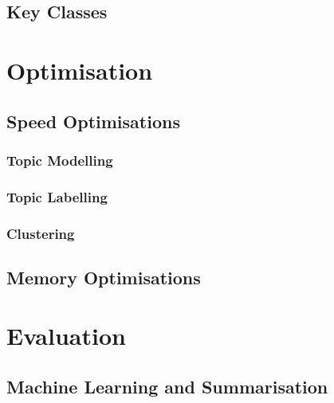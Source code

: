 \documentclass[12pt]{article}
\begin{document}
\label{frontendimplementation}

\subsection{Key Classes}



\newpage

\section{Optimisation}

\subsection{Speed Optimisations}

\subsubsection{Topic Modelling}

\label{topicmodellingoptimisation}

\subsubsection{Topic Labelling}

\subsubsection{Clustering}

\subsection{Memory Optimisations}


\newpage

\section{Evaluation}

\subsection{Machine Learning and Summarisation}
\end{document}
